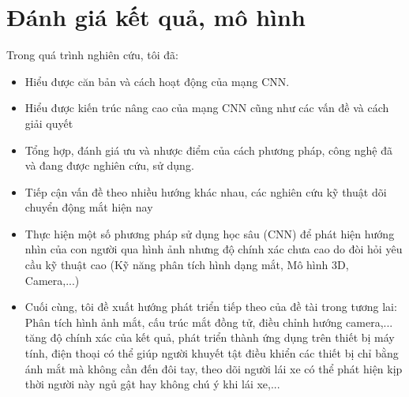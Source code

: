 \section{Đánh giá kết quả, mô hình}
Trong quá trình nghiên cứu, tôi đã:
\begin{itemize}
\item Hiểu được căn bản và cách hoạt động của mạng CNN.

\item Hiểu được kiến trúc nâng cao của mạng CNN cũng như các vấn đề và cách giải quyết

\item Tổng hợp, đánh giá ưu và nhược điểm của cách phương pháp, công nghệ đã và đang được nghiên cứu, sử dụng. 

\item Tiếp cận vấn đề theo nhiều hướng khác nhau, các nghiên cứu kỹ thuật dõi chuyển động mắt hiện nay

\item Thực hiện một số phương pháp sử dụng học sâu (CNN) để phát hiện hướng nhìn của con người qua hình ảnh nhưng độ chính xác chưa cao do đòi hỏi  yêu cầu kỹ thuật cao (Kỹ năng phân tích hình dạng mắt, Mô hình 3D, Camera,...)

\item Cuối cùng, tôi đề xuất hướng phát triển tiếp theo của đề tài trong tương lai: Phân tích hình ảnh mắt, cấu trúc mắt đồng tử, điều chỉnh hướng camera,... tăng độ chính xác của kết quả, phát triển thành ứng dụng trên thiết bị máy tính, điện thoại có thể giúp người khuyết tật điều khiển các thiết bị chỉ bằng ánh mắt mà không cần đến đôi tay, theo dõi người lái xe có thể phát hiện kịp thời người này ngủ gật hay không chú ý khi lái xe,...
\end{itemize}